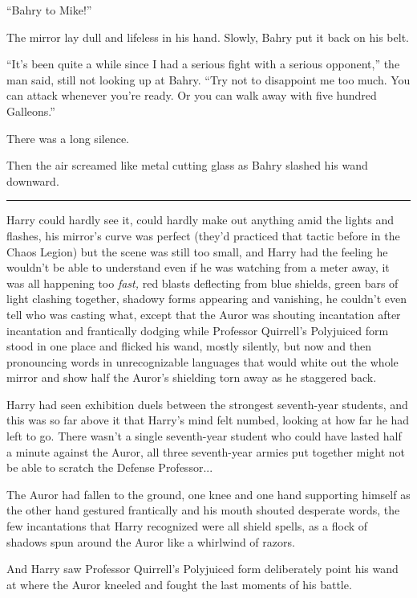 ``Bahry to Mike!''

The mirror lay dull and lifeless in his hand. Slowly, Bahry put it back on his belt.

``It's been quite a while since I had a serious fight with a serious opponent,'' the man said, still not looking up at Bahry. ``Try not to disappoint me too much. You can attack whenever you're ready. Or you can walk away with five hundred Galleons.''

There was a long silence.

Then the air screamed like metal cutting glass as Bahry slashed his wand downward.

\begin{center}\rule{3in}{0.4pt}\end{center}

Harry could hardly see it, could hardly make out anything amid the lights and flashes, his mirror's curve was perfect (they'd practiced that tactic before in the Chaos Legion) but the scene was still too small, and Harry had the feeling he wouldn't be able to understand even if he was watching from a meter away, it was all happening too \emph{fast,} red blasts deflecting from blue shields, green bars of light clashing together, shadowy forms appearing and vanishing, he couldn't even tell who was casting what, except that the Auror was shouting incantation after incantation and frantically dodging while Professor Quirrell's Polyjuiced form stood in one place and flicked his wand, mostly silently, but now and then pronouncing words in unrecognizable languages that would white out the whole mirror and show half the Auror's shielding torn away as he staggered back.

Harry had seen exhibition duels between the strongest seventh-year students, and this was so far above it that Harry's mind felt numbed, looking at how far he had left to go. There wasn't a single seventh-year student who could have lasted half a minute against the Auror, all three seventh-year armies put together might not be able to scratch the Defense Professor...

The Auror had fallen to the ground, one knee and one hand supporting himself as the other hand gestured frantically and his mouth shouted desperate words, the few incantations that Harry recognized were all shield spells, as a flock of shadows spun around the Auror like a whirlwind of razors.

And Harry saw Professor Quirrell's Polyjuiced form deliberately point his wand at where the Auror kneeled and fought the last moments of his battle.

